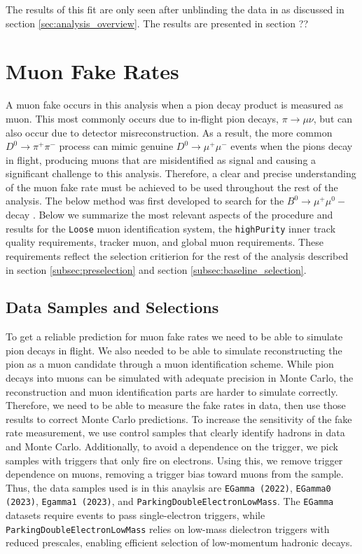 The results of this fit are only seen after unblinding the data in as discussed in section \ref{sec:analysis_overview}. The results are presented in section ??


\section{Muon Fake Rates}
\label{sec:muon_fake_rate}

A muon fake occurs in this analysis when a pion decay product is measured as muon. This most commonly occurs due to in-flight pion decays, $\pi \to \mu \nu$, but can also occur due to detector misreconstruction. As a result, the more common $D^0 \to \pi^+ \pi^-$ process can mimic genuine $D^0 \to \mu^+ \mu^-$ events when the pions decay in flight, producing muons that are misidentified as signal and causing a significant challenge to this analysis. Therefore, a clear and precise understanding of the muon fake rate must be achieved to be used throughout the rest of the analysis. The below method was first developed to search for the $B^0 \to \mu^+ \mu^0-$ decay \cite{ref:2023b0mumu}. Below we summarize the most relevant aspects of the procedure and results for the \texttt{Loose} muon identification system, the \texttt{highPurity} inner track quality requirements, tracker muon, and global muon requirements. These requirements reflect the selection critierion for the rest of the analysis described in section \ref{subsec:preselection} and section \ref{subsec:baseline_selection}.

\subsection{Data Samples and Selections}

To get a reliable prediction for muon fake rates we need to be able to simulate pion decays in flight. We also needed to be able to simulate reconstructing the pion as a muon candidate through a muon identification scheme. While pion decays into muons can be simulated with adequate precision in Monte Carlo, the reconstruction and muon identification parts are harder to simulate correctly. Therefore, we need to be able to measure the fake rates in data, then use those results to correct Monte Carlo predictions. To increase the sensitivity of the fake rate measurement, we use control samples that clearly identify hadrons in data and Monte Carlo. Additionally, to avoid a dependence on the trigger, we pick samples with triggers that only fire on  electrons. Using this, we remove trigger dependence on muons, removing a trigger  bias toward muons from the sample. Thus, the data samples used is in this anaylsis are \texttt{EGamma (2022)}, \texttt{EGamma0 (2023)}, \texttt{Egamma1 (2023)}, and \texttt{ParkingDoubleElectronLowMass}. The \texttt{EGamma} datasets require events to pass single-electron triggers, while \texttt{ParkingDoubleElectronLowMass} relies on low-mass dielectron triggers with reduced prescales, enabling efficient selection of low-momentum hadronic decays.

